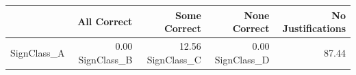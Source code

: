 \begin{tabular}{lrrrr}
\toprule
 & All Correct & Some Correct & None Correct & No Justifications \\
\midrule
SignClass_A & 0.00%
SignClass_B & 12.56%
SignClass_C & 0.00%
SignClass_D & 87.44%
\bottomrule
\end{tabular}
